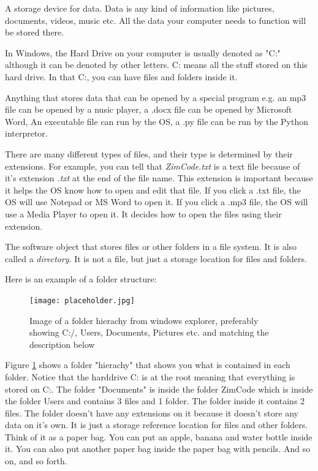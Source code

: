 \begin{definition} A storage device for data. Data is any kind of information like pictures, documents, videos, music etc. All the data your computer needs to function will be stored there.
\end{definition}

In Windows, the Hard Drive on your computer is usually denoted as "C:" although it can be denoted by other letters. C: means all the stuff stored on this hard drive. In that C:, you can have files and folders inside it.

\begin{definition}[File] Anything that stores data that can be opened by a special program e.g. an mp3 file can be opened by a nusic player, a .docx file can be opened by Microsoft Word, An executable file can run by the OS, a .py file can be run by the Python interpretor.
\end{definition}

There are many different types of files, and their type is determined by their extensions. For example, you can tell that \textit{ZimCode.txt} is a text file because of it's extension \textit{.txt} at the end of the file name. This extension is important because it helps the OS know how to open and edit that file. If you click a .txt file, the OS will use Notepad or MS Word to open it. If you click a .mp3 file, the OS will use a Media Player to open it. It decides how to open the files using their extension.

\begin{definition} The software object that stores files or other folders in a file system. It is also called a \textit{directory}. It is not a file, but just a storage location for files and folders. 
\end{definition}

Here is an example of a folder structure:

%
\begin{figure}[h]
\centering\texttt{[image: placeholder.jpg]}
\caption{Image of a folder hierachy from windows explorer, preferably showing C:/, Users, Documents, Pictures etc. and matching the description below}
\label{fig:filehierachy} %
\end{figure}
%

Figure \ref{fig:filehierachy} shows a folder "hierachy" that shows you what is contained in each folder. Notice that the harddrive C: is at the root meaning that everything is stored on C:. The folder "Documents" is inside the folder ZimCode which is inside the folder Users and contains 3 files and 1 folder. The folder inside it contains 2 files. The folder doesn't have any extensions on it because it doesn't store any data on it's own. It is just a storage reference location for files and other folders.
Think of it as a paper bag. You can put an apple, banana and water bottle inside it. You can also put another paper bag inside the paper bag with pencils. And so on, and so forth.

